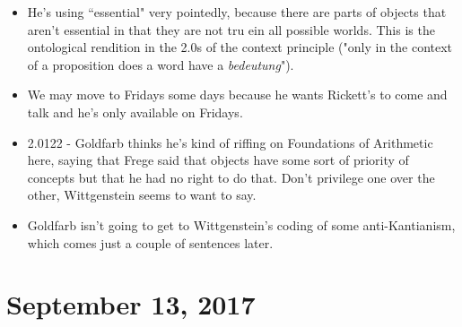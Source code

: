 \documentclass[12pt]{article}
\theoremstyle{definition}
\begin{document}
\begin{itemize}
    \item He's using ``essential" very pointedly, because there are parts of objects that aren't essential in that they are not tru ein all possible worlds. This is the ontological rendition in the 2.0s of the context principle ("only in the context of a proposition does a word have a \textit{bedeutung}").
    \item We may move to Fridays some days because he wants Rickett's to come and talk and he's only available on Fridays.
    \item 2.0122 - Goldfarb thinks he's kind of riffing on Foundations of Arithmetic here, saying that Frege said that objects have some sort of priority of concepts but that he had no right to do that. Don't privilege one over the other, Wittgenstein seems to want to say.
    \item Goldfarb isn't going to get to Wittgenstein's coding of some anti-Kantianism, which comes just a couple of sentences later.
\end{itemize}

\section{September 13, 2017}
\end{document}
